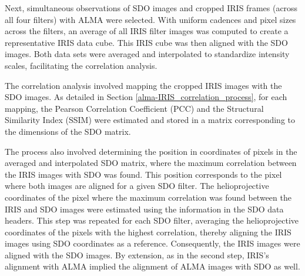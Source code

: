 \documentclass[a4paper,alpha-refs]{eSpectra}
\begin{document}
Next, simultaneous observations of SDO images and cropped IRIS frames (across all four filters) with ALMA were selected. With uniform cadences and pixel sizes across the filters, an average of all IRIS filter images was computed to create a representative IRIS data cube. This IRIS cube was then aligned with the SDO images. Both data sets were averaged and interpolated to standardize intensity scales, facilitating the correlation analysis.

The correlation analysis involved mapping the cropped IRIS images with the SDO images. As detailed in Section \ref{alma-IRIS_correlation_process}, for each mapping, the Pearson Correlation Coefficient (PCC) and the Structural Similarity Index (SSIM) were estimated and stored in a matrix corresponding to the dimensions of the SDO matrix.




The process also involved determining the position in coordinates of pixels in the averaged and interpolated SDO matrix, where the maximum correlation between the IRIS images with SDO was found. This position corresponds to the pixel where both images are aligned for a given SDO filter. The helioprojective coordinates of the pixel where the maximum correlation was found between the IRIS and SDO images were estimated using the information in the SDO data headers. This step was repeated for each SDO filter, averaging the helioprojective coordinates of the pixels with the highest correlation, thereby aligning the IRIS images using SDO coordinates as a reference. Consequently, the IRIS images were aligned with the SDO images. By extension, as in the second step, IRIS's alignment with ALMA implied the alignment of ALMA images with SDO as well.
\end{document}
